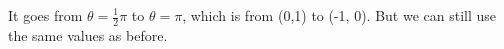 \documentclass[preview]{standalone}
\begin{document}
\begin{center}
It goes from $\theta = \frac{1}{2} \pi$ to $\theta = \pi$, which is from (0,1) to (-1, 0). But we can still use the same values as before.
\end{center}
\end{document}
